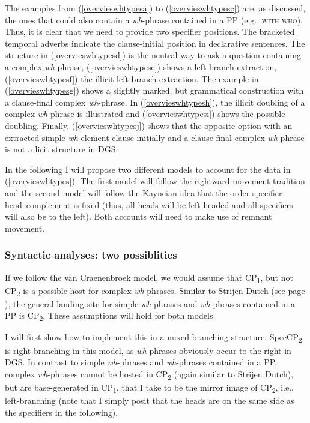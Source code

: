 \noindent The examples from (\ref{overvieswhtypesa}) to (\ref{overvieswhtypesc}) are, as discussed, the ones that could also contain a \textit{wh}-phrase contained in a PP (e.g., \textsc{with who}). Thus, it is clear that we need to provide two specifier positions. The bracketed temporal adverbs indicate the clause-initial position in declarative sentences. The structure in (\ref{overvieswhtypesd}) is the neutral way to ask a question containing a complex \textit{wh}-phrase, (\ref{overvieswhtypese}) shows a left-branch extraction, (\ref{overvieswhtypesf}) the illicit left-branch extraction. The example in (\ref{overvieswhtypesg}) shows a slightly marked, but grammatical construction with a clause-final complex \textit{wh}-phrase. In (\ref{overvieswhtypesh}), the illicit doubling of a complex \textit{wh}-phrase is illustrated and (\ref{overvieswhtypesi}) shows the possible doubling. Finally, (\ref{overvieswhtypesj}) shows that the opposite option with an extracted simple \textit{wh}-element clause-initially and a clause-final complex \textit{wh}-phrase is not a licit structure in DGS.

In the following I will propose two different models to account for the data in (\ref{overvieswhtypes}). The first model will follow the rightward-movement tradition and the second model will follow the Kayneian idea that the order specifier--head--complement is fixed (thus, all heads will be left-headed and all specifiers will also be to the left). Both accounts will need to make use of remnant movement.
\vspace{-0.3cm}
\subsubsection{Syntactic analyses: two possiblities}
\vspace{-0.3cm}
If we follow the van Craenenbroek model, we would assume that CP\textsubscript{1}, but not CP\textsubscript{2} is a possible host for complex \textit{wh}-phrases. Similar to Strijen Dutch (see page \pageref{vancraenenbroekdutchdialecta}), the general landing site for simple \textit{wh}-phrases and \textit{wh}-phrases contained in a PP is CP\textsubscript{2}. These assumptions will hold for both models.

I will first show how to implement this in a mixed-branching structure. SpecCP\textsubscript{2} is right-branching in this model, as \textit{wh}-phrases obviously occur to the right in DGS. In contrast to simple \textit{wh}-phrases and \textit{wh}-phrases contained in a PP, complex \textit{wh}-phrases cannot be hosted in CP\textsubscript{2} (again similar to Strijen Dutch), but are base-generated in CP\textsubscript{1}, that I take to be the mirror image of CP\textsubscript{2}, i.e., left-branching (note that I simply posit that the heads are on the same side as the specifiers in the following). 

